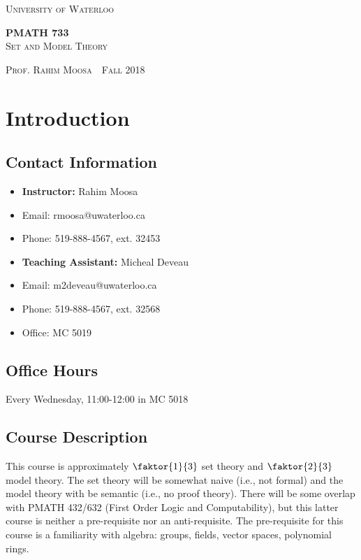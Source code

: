 \documentclass[11pt]{article}
\newcommand{\thiscoursecode}{PMATH 733}
\newcommand{\thiscoursename}{Set and Model Theory}
\newcommand{\thisprof}{Rahim Moosa}
\newcommand{\thisterm}{Fall 2018}
\begin{document}
\begin{titlepage}
    \begin{centering}
        {\scshape\LARGE University of Waterloo \par}
        \globe
        {\huge\bf \thiscoursecode}\\
        {\scshape\Large \thiscoursename}\\
        \vspace{.3cm}
        {\scshape Prof. \thisprof~\textbullet~\thisterm\par}
    \end{centering}
\sectionline
\tableofcontents
\sectionline
\thispagestyle{empty}

\pagebreak
\section{Introduction}
\subsection{Contact Information}
\begin{itemize}
    \item {\bf Instructor:} Rahim Moosa
    \item Email: rmoosa@uwaterloo.ca
    \item Phone: 519-888-4567, ext. 32453
\\
    \item {\bf Teaching Assistant:} Micheal Deveau
    \item Email: m2deveau@uwaterloo.ca
    \item Phone: 519-888-4567, ext. 32568
    \item Office: MC 5019
\end{itemize}

\subsection{Office Hours}
Every Wednesday, 11:00-12:00 in MC 5018

\subsection{Course Description}
This course is approximately $\faktor{1}{3}$ set theory and $\faktor{2}{3}$
model theory. The set theory will be somewhat naive (i.e., not formal) and the
model theory with be semantic (i.e., no proof theory). There will be some
overlap with PMATH 432/632 (First Order Logic and Computability), but this
latter course is neither a pre-requisite nor an anti-requisite. The
pre-requisite for this course is a familiarity with algebra: groups, fields,
vector spaces, polynomial rings.


\end{titlepage}
\end{document}
